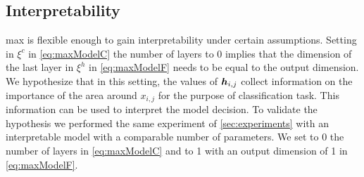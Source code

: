 \subsection{Interpretability}
\ac{max} is flexible enough to gain interpretability under certain
assumptions. Setting in $\xi^c$ in \eqref{eq:maxModelC} the number of
layers to 0 implies that 
the dimension of the last layer in $\xi^h$ in \eqref{eq:maxModelF}
needs to be equal to the
output dimension. We hypothesize that in this setting, the values of
$\bm{h}_{i,j}$ collect information on the importance of the area
around $x_{i,j}$ for the purpose of classification task. This
information can be
used to interpret the model decision. To validate the
hypothesis we performed the same experiment of \cref{sec:experiments}
with an interpretable model with a comparable number of parameters. We
set to 0 the number of layers in \eqref{eq:maxModelC} and to 1 with an
output dimension of 1  in
\eqref{eq:maxModelF}. 

